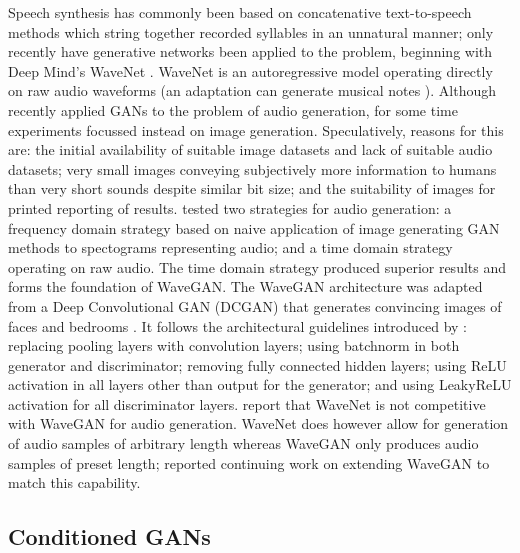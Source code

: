 \documentclass[a4paper, dvipsnames, titlepage]{article}
\begin{document}
Speech synthesis has commonly been based on concatenative text-to-speech methods which string together recorded syllables in an unnatural manner; only recently have generative networks been applied to the problem, beginning with Deep Mind's WaveNet \citep{waveNetUrl}.
WaveNet is an autoregressive model operating directly on raw audio waveforms \citep{DBLP:journals/corr/OordDZSVGKSK16} (an adaptation can generate musical notes \citep{2017arXiv170401279E}).
\newline
\newline
Although \citeauthor{2018arXiv180204208D} recently applied GANs to the problem of audio generation, for some time experiments focussed instead on image generation.
Speculatively, reasons for this are: the initial availability of suitable image datasets and lack of suitable audio datasets; very small images conveying subjectively more information to humans than very short sounds despite similar bit size; and the suitability of images for printed reporting of results.
\newline
\newline
\citeauthor{2018arXiv180204208D} tested two strategies for audio generation: a frequency domain strategy based on naive application of image generating GAN methods to spectograms representing audio; and a time domain strategy operating on raw audio.
The time domain strategy produced superior results and forms the foundation of WaveGAN.
\newline
\newline
The WaveGAN architecture was adapted from a Deep Convolutional GAN (DCGAN) that generates convincing images of faces and bedrooms \citep{2015arXiv151106434R}.
It follows the architectural guidelines introduced by \citeauthor{2015arXiv151106434R}: replacing pooling layers with convolution layers; using batchnorm in both generator and discriminator; removing fully connected hidden layers; using ReLU activation in all layers other than output for the generator; and using LeakyReLU activation for all discriminator layers.
\newline
\newline
\citeauthor{2018arXiv180204208D} report that WaveNet is not competitive with WaveGAN for audio generation.
WaveNet does however allow for generation of audio samples of arbitrary length whereas WaveGAN only produces audio samples of preset length; \citeauthor{2018arXiv180204208D} reported continuing work on extending WaveGAN to match this capability.

\subsection{Conditioned GANs}
\end{document}
